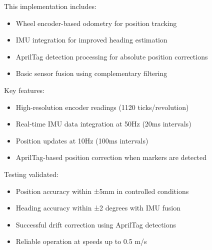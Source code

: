 \documentclass{article}
\begin{document}
This implementation includes:
\begin{itemize}
    \item Wheel encoder-based odometry for position tracking
    \item IMU integration for improved heading estimation
    \item AprilTag detection processing for absolute position corrections
    \item Basic sensor fusion using complementary filtering
\end{itemize}

Key features:
\begin{itemize}
    \item High-resolution encoder readings (1120 ticks/revolution)
    \item Real-time IMU data integration at 50Hz (20ms intervals)
    \item Position updates at 10Hz (100ms intervals)
    \item AprilTag-based position correction when markers are detected
\end{itemize}

Testing validated:
\begin{itemize}
    \item Position accuracy within ±5mm in controlled conditions
    \item Heading accuracy within ±2 degrees with IMU fusion
    \item Successful drift correction using AprilTag detections
    \item Reliable operation at speeds up to 0.5 m/s
\end{itemize}
\end{document}
